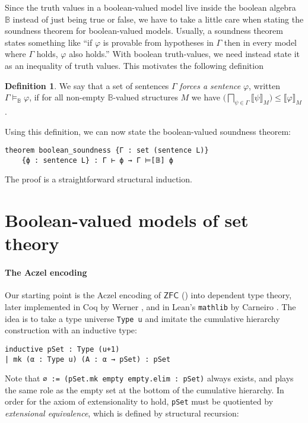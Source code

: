 \documentclass[sigplan,10pt,review, anonymous]{acmart}
\newcommand{\B}{\mathbb{B}}
\theoremstyle{definition}
\newtheorem{defn}{Definition}[section]
\newcommand{\B}{\mathbb{B}}
\begin{document}
Since the truth values in a boolean-valued model live inside the boolean algebra $\B$ instead of just being true or false, we have to take a little care when stating the soundness theorem for boolean-valued models.
Usually, a soundness theorem states something like ``if $\varphi$ is provable from hypotheses in $\Gamma$ then in every model where $\Gamma$ holds, $\varphi$ also holds.''
With boolean truth-values, we need instead state it as an inequality of truth values. This motivates the following definition
\begin{defn}
We say that a set of sentences $\Gamma$ \emph{forces a sentence} $\varphi$, written $\Gamma \models_{\B}\varphi$, if for all non-empty $\B$-valued structures $M$ we have $\big(\bigsqcap_{\psi\in\Gamma}\big \llbracket \psi \rrbracket_M)\le\llbracket \varphi \rrbracket_M$.
\end{defn}
Using this definition, we can now state the boolean-valued soundness theorem:
\begin{lstlisting}
theorem boolean_soundness {Γ : set (sentence L)}
    {ϕ : sentence L} : Γ ⊢ ϕ → Γ ⊨[𝔹] ϕ
\end{lstlisting}
The proof is a straightforward structural induction.

\section{Boolean-valued models of set theory}
\label{subsection:fol:bset}
\paragraph{The Aczel encoding}
Our starting point is the Aczel encoding of \(\mathsf{ZFC}\) (\cite{aczel1978type, aczel1986type, aczel1982type}) into dependent type theory, later implemented in Coq by Werner \cite{werner1997sets}, and in Lean's \lstinline{mathlib} by Carneiro \cite{mario1}. The idea is to take a type universe \lstinline{Type u} and imitate the cumulative hierarchy construction with an inductive type:
\begin{lstlisting}[breaklines, basicstyle=\ttfamily\small]
inductive pSet : Type (u+1)
| mk (α : Type u) (A : α → pSet) : pSet
\end{lstlisting}
Note that \lstinline{∅ := (pSet.mk empty empty.elim : pSet)} always exists, and plays the same role as the empty set at the bottom of the cumulative hierarchy. In order for the axiom of extensionality to hold, \lstinline{pSet} must be quotiented by \emph{extensional equivalence}, which is defined by structural recursion:
\end{document}
